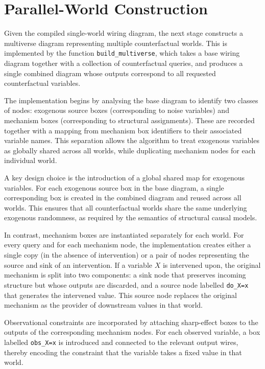 \documentclass[a4paper]{report}
\begin{document}
\section{Parallel-World Construction}

Given the compiled single-world wiring diagram, the next stage constructs a multiverse diagram representing multiple counterfactual worlds. This is implemented by the function \texttt{build\_multiverse}, which takes a base wiring diagram together with a collection of counterfactual queries, and produces a single combined diagram whose outputs correspond to all requested counterfactual variables.

The implementation begins by analysing the base diagram to identify two classes of nodes: exogenous source boxes (corresponding to noise variables) and mechanism boxes (corresponding to structural assignments). These are recorded together with a mapping from mechanism box identifiers to their associated variable names. This separation allows the algorithm to treat exogenous variables as globally shared across all worlds, while duplicating mechanism nodes for each individual world.

A key design choice is the introduction of a global shared map for exogenous variables. For each exogenous source box in the base diagram, a single corresponding box is created in the combined diagram and reused across all worlds. This ensures that all counterfactual worlds share the same underlying exogenous randomness, as required by the semantics of structural causal models.

In contrast, mechanism boxes are instantiated separately for each world. For every query and for each mechanism node, the implementation creates either a single copy (in the absence of intervention) or a pair of nodes representing the source and sink of an intervention. If a variable $X$ is intervened upon, the original mechanism is split into two components: a sink node that preserves incoming structure but whose outputs are discarded, and a source node labelled \texttt{do\_X=x} that generates the intervened value. This source node replaces the original mechanism as the provider of downstream values in that world.

Observational constraints are incorporated by attaching sharp-effect boxes to the outputs of the corresponding mechanism nodes. For each observed variable, a box labelled \texttt{obs\_X=x} is introduced and connected to the relevant output wires, thereby encoding the constraint that the variable takes a fixed value in that world.
\end{document}
